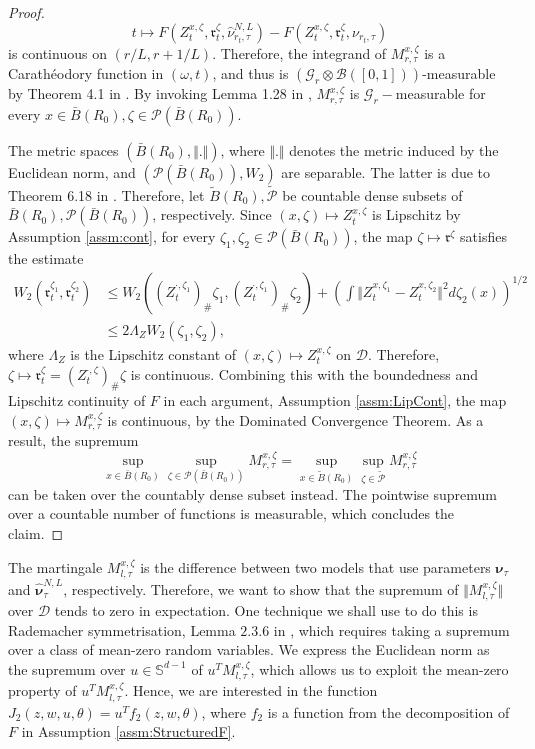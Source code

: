 \documentclass{article}
\begin{document}
\begin{appendices}
\begin{proof}
\[
t\mapsto F(Z_t^{x,\zeta},\mathfrak{r}^\zeta_t,\hat\nu^{N,L}_{r_t,\tau})-F(Z_t^{x,\zeta},\mathfrak{r}^\zeta_t,\nu_{r_t,\tau})
\]
 is continuous on $(r/L,{r+1}/L)$. Therefore, the integrand of $M^{x,\zeta}_{r,\tau}$ is a Carath\'eodory function in $(\omega,t)$, and thus is $(\mathcal G_r\otimes \mathcal B([0,1]))$-measurable by Theorem 4.1 in \cite{AZHMYAKOV201987}. By invoking Lemma 1.28 in \cite{Kallenberg2021}, $M^{x,\zeta}_{r,\tau}$ is $\mathcal G_{r}-$measurable for every $x\in \bar B(R_0),\zeta\in \mathcal P(\bar B(R_0))$. 
 
 The metric spaces $(\bar B(R_0),\Vert.\Vert)$, where $\Vert.\Vert$ denotes the metric induced by the Euclidean norm, and $(\mathcal P(\bar B(R_0)), W_2)$ are separable. The latter is due to Theorem 6.18 in \cite{villani2008optimal}. Therefore, let $\tilde B(R_0), \tilde{\mathcal P}$ be countable dense subsets of $ \bar B(R_0), \mathcal P(\bar B(R_0))$, respectively.  Since $(x,\zeta)\mapsto Z^{x,\zeta}_t$ is Lipschitz by Assumption \ref{assm:cont}, for every $\zeta_1,\zeta_2\in \mathcal P(\bar B(R_0))$, the map $\zeta \mapsto \mathfrak{r}^\zeta$ satisfies the estimate
 \begin{align*}
W_2(\mathfrak{r}^{\zeta_1}_t,\mathfrak{r}^{\zeta_2}_t)&\le W_2((Z^{\cdot,\zeta_1}_t)_\#\zeta_1,(Z^{\cdot,\zeta_1}_t)_\#\zeta_2)+ \left(\int \Vert Z^{x,\zeta_1}_t-Z^{x,\zeta_2}_t\Vert^2 d\zeta_2(x) \right)^{1/2}\\
& \le 2 \Lambda_Z W_2(\zeta_1,\zeta_2),
 \end{align*}
 where $\Lambda_Z$ is the Lipschitz constant of $(x,\zeta)\mapsto Z^{x,\zeta}_t$ on $\mathscr{D}$. Therefore,
 $\zeta\mapsto\mathfrak{r}^\zeta_t= (Z^{\cdot,\zeta}_t)_\#\zeta$ is continuous.
 Combining this with the boundedness and Lipschitz continuity of $F$ in each argument, Assumption \ref{assm:LipCont}, the map $(x,\zeta)\mapsto M^{x,\zeta}_{r,\tau}$ is continuous, by the Dominated Convergence Theorem. As a result, the supremum
  \[
   \sup_{x\in \bar B(R_0)}\sup_{\zeta\in \mathcal P(\bar B(R_0))} M^{x,\zeta}_{r,\tau}= \sup_{x\in \tilde{B}(R_0)}\sup_{\zeta\in \tilde{\mathcal P}} M^{x,\zeta}_{r,\tau}
  \]
  can be taken over the countably dense subset instead. The pointwise supremum over a countable number of functions is measurable, which concludes the claim.
\end{proof}
The martingale $M^{x,\zeta}_{l,\tau}$ is the difference between two models that use parameters $\bm\nu_\tau$ and $\bm{\hat \nu}^{N,L}_\tau$, respectively. Therefore, we want to show that the supremum of $\Vert M^{x,\zeta}_{l,\tau}\Vert$ over $\mathscr{D}$ tends to zero in expectation. One technique we shall use to do this is Rademacher symmetrisation, Lemma $2.3.6$ in \cite{vanderVaart1996}, which requires taking a supremum over a class of mean-zero random variables. We express the Euclidean norm as the supremum over $u\in \mathbb S^{d-1}$ of $u^TM^{x,\zeta}_{l,\tau}$, which allows us to exploit the mean-zero property of $u^TM^{x,\zeta}_{l,\tau}$. Hence, we are interested in the function $J_2(z,w,u,\theta)=u^Tf_2(z,w,\theta)$, where $f_2$ is a function from the decomposition of $F$ in Assumption \ref{assm:StructuredF}.

\end{appendices}
\end{document}

